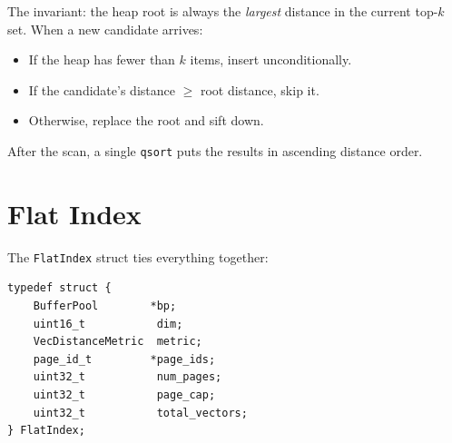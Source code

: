 \documentclass[12pt, a4paper]{report}
\begin{document}
\begin{center}
\end{center}

The invariant: the heap root is always the \textit{largest} distance in the
current top-$k$ set. When a new candidate arrives:

\begin{itemize}[itemsep=2pt]
    \item If the heap has fewer than $k$ items, insert unconditionally.
    \item If the candidate's distance $\geq$ root distance, skip it.
    \item Otherwise, replace the root and sift down.
\end{itemize}

After the scan, a single \texttt{qsort} puts the results in ascending
distance order.


\section{Flat Index}

The \texttt{FlatIndex} struct ties everything together:

\begin{lstlisting}
typedef struct {
    BufferPool        *bp;
    uint16_t           dim;
    VecDistanceMetric  metric;
    page_id_t         *page_ids;
    uint32_t           num_pages;
    uint32_t           page_cap;
    uint32_t           total_vectors;
} FlatIndex;
\end{lstlisting}
\end{document}
